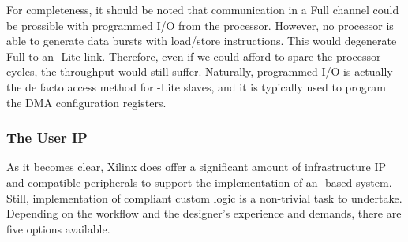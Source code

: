 For completeness, it should be noted that communication in a Full  channel could be prossible
with programmed I/O from the processor. However, no processor is able to generate data bursts
with load/store instructions. This would degenerate Full  to an -Lite link. 
Therefore, even if we could afford to spare the processor cycles, the throughput would still suffer.
Naturally, programmed I/O is actually the de facto access method for -Lite slaves,
and it is typically used to program the DMA configuration registers.

\subsubsection{The User IP}

As it becomes clear, Xilinx does offer a significant amount of 
 infrastructure IP and  compatible peripherals
to support the implementation of an -based system.
Still, implementation of  compliant custom logic is a non-trivial task to undertake.
Depending on the workflow and the designer's experience and demands,
there are five options available.

